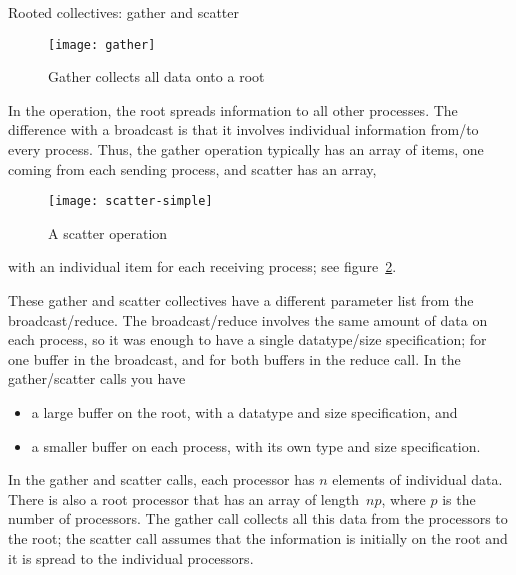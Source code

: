 
 {Rooted collectives: gather and scatter}
\label{sec:gatherscatter}

\begin{figure}[ht]
  \texttt{[image: gather]}
  \caption{Gather collects all data onto a root}
  \label{fig:gather}
\end{figure}

In the  operation, the root spreads information to
all other processes. The difference with a broadcast is that it involves
individual information from/to every process. Thus, the gather operation typically 
has an array of items, one coming from each sending process, and scatter has an array,
\begin{figure}[ht]
  \texttt{[image: scatter-simple]}
  \caption{A scatter operation}
  \label{fig:scatter}
\end{figure}
with an individual item for each receiving process; see figure~\ref{fig:scatter}.

These gather and scatter collectives have a different parameter list from
the broadcast/reduce. The broadcast/reduce involves the same amount
of data on each process, so it was enough to have a single
datatype/size specification; for one buffer in the broadcast, and
for both buffers in the reduce call.
In the gather/scatter calls you have
\begin{itemize}
\item a large buffer on the root, with a datatype and size specification, and
\item a smaller buffer on each process, with its own type and size specification.
\end{itemize}

In the gather and scatter calls, each processor has $n$ elements of individual
data. There is also a root processor that has an array of length~$np$, where $p$
is the number of processors. The gather call collects all this data from the 
processors to the root; the scatter call assumes that the information is 
initially on the root and it is spread to the individual processors.

